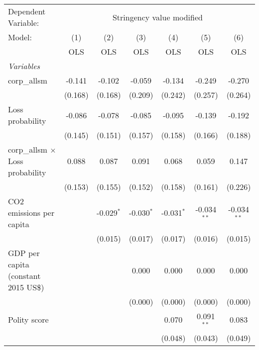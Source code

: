 
\begingroup
\centering
\begin{tabular}{lcccccc}
   \toprule
   Dependent Variable: & \multicolumn{6}{c}{Stringency value modified}\\
   Model:                                  & (1)     & (2)          & (3)          & (4)          & (5)           & (6)\\  
                                           &  OLS    & OLS          & OLS          & OLS          & OLS           & OLS\\  
   \midrule
   \emph{Variables}\\
   corp\_allsm                             & -0.141  & -0.102       & -0.059       & -0.134       & -0.249        & -0.270\\   
                                           & (0.168) & (0.168)      & (0.209)      & (0.242)      & (0.257)       & (0.264)\\   
   Loss probability                        & -0.086  & -0.078       & -0.085       & -0.095       & -0.139        & -0.192\\   
                                           & (0.145) & (0.151)      & (0.157)      & (0.158)      & (0.166)       & (0.188)\\   
   corp\_allsm $\times$ Loss probability   & 0.088   & 0.087        & 0.091        & 0.068        & 0.059         & 0.147\\   
                                           & (0.153) & (0.155)      & (0.152)      & (0.158)      & (0.161)       & (0.226)\\   
   CO2 emissions per capita                &         & -0.029$^{*}$ & -0.030$^{*}$ & -0.031$^{*}$ & -0.034$^{**}$ & -0.034$^{**}$\\   
                                           &         & (0.015)      & (0.017)      & (0.017)      & (0.016)       & (0.015)\\   
   GDP per capita (constant 2015 US\$)     &         &              & 0.000        & 0.000        & 0.000         & 0.000\\   
                                           &         &              & (0.000)      & (0.000)      & (0.000)       & (0.000)\\   
   Polity score                            &         &              &              & 0.070        & 0.091$^{**}$  & 0.083\\   
                                           &         &              &              & (0.048)      & (0.043)       & (0.049)\\   

\end{tabular}

